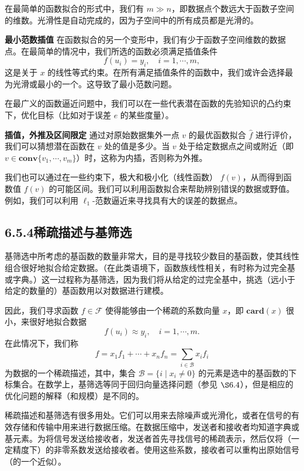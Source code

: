 \documentclass[UTF8, 12pt, fontset=fandol, oneside]{ctexart}
\begin{document}
在最简单的函数拟合的形式中，我们有 $m\gg n$，即数据点个数远大于函数子空间的维数。光滑性是自动完成的，因为子空间中的所有成员都是光滑的。

\noindent\textbf{最小范数插值}\quad
在函数拟合的另一个变形中，我们有少于函数子空间维数的数据点。在最简单的情况中，我们所选的函数必须满足插值条件
\[
f(u_i)=y_i,\quad i=1,\cdots,m,
\]
这是关于 $x$ 的线性等式约束。在所有满足插值条件的函数中，我们或许会选择最为光滑或最小的一个。这导致了最小范数问题。

在最广义的函数逼近问题中，我们可以在一些代表潜在函数的先验知识的凸约束下，优化目标（比如对于误差 $e$ 的某些度量）。

\noindent\textbf{插值，外推及区间限定}\quad
通过对原始数据集外一点 $v$ 的最优函数拟合 $\hat{f}$ 进行评价，我们可以猜想潜在函数在 $v$ 处的值是多少。当 $v$ 处于给定数据点之间或附近（即 $v\in\mathbf{conv}\{v_1,\cdots,v_m\}$）时，这称为内插，否则称为外推。

我们也可以通过在一些约束下，极大和极小化（线性函数） $f(v)$，从而得到函数值 $f(v)$ 的可能区间。我们可以利用函数拟合来帮助辨别错误的数据或野值。例如，我们可以利用 $\ell_1$-范数逼近来寻找具有大的误差的数据点。

\subsection*{6.5.4\quad 稀疏描述与基筛选}

基筛选中所考虑的基函数的数量非常大，目的是寻找较少数目的基函数，使其线性组合很好地拟合给定数据。（在此类语境下，函数族线性相关，有时称为过完全基或字典。）这一过程称为基筛选，因为我们将从给定的过完全基中，挑选（远小于给定的数量的）基函数用以对数据进行建模。

因此，我们寻求函数 $f\in\mathcal{F}$ 使得能够由一个稀疏的系数向量 $x$，即 $\mathbf{card}(x)$ 很小，来很好地拟合数据
\[
f(u_i)\approx y_i,\quad i=1,\cdots,m.
\]
在此情况下，我们称
\[
f=x_1f_1+\cdots+x_nf_n=\sum_{i\in\mathcal{B}}x_if_i
\]
为数据的一个稀疏描述，其中，集合 $\mathcal{B}=\{i\mid x_i\neq 0\}$ 的元素是选中的基函数的下标集合。在数学上，基筛选等同于回归向量选择问题（参见 $\S 6.4$），但是相应的优化问题的解释（和规模）是不同的。

稀疏描述和基筛选有很多用处。它们可以用来去除噪声或光滑化，或者在信号的有效存储和传输中用来进行数据压缩。在数据压缩中，发送者和接收者均知道字典或基元素。为将信号发送给接收者，发送者首先寻找信号的稀疏表示，然后仅将（一定精度下）的非零系数发送给接收者。使用这些系数，接收者可以重构出原始信号（的一个近似）。
\end{document}
